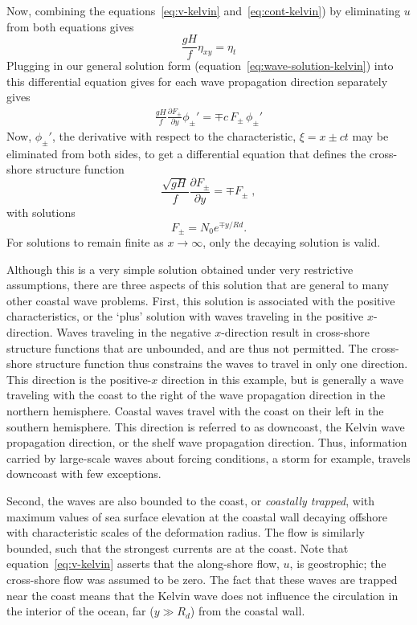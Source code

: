 \documentclass[11pt]{report}
\numberwithin{equation}{section}
\begin{document}
Now, combining the equations~\ref{eq:v-kelvin} and~\ref{eq:cont-kelvin}) by eliminating $u$ from both equations gives
\begin{equation}
    \label{eq:F-solution-kelvin}
    \frac{g H}{f} \eta_{x y} = \eta_t
\end{equation}
Plugging in our general solution form (equation~\ref{eq:wave-solution-kelvin})  into this differential equation gives for each wave propagation direction separately gives
\begin{align}
    \frac{g H}{f} \frac{\partial F_\pm}{\partial y} \phi_\pm' = \mp c \,F_\pm\,\phi_\pm'
\end{align}
Now, $\phi_\pm'$, the derivative with respect to the characteristic, $\xi=x \pm c t$ may be eliminated from both sides, to get a differential equation that defines the cross-shore structure function
\begin{equation}
    \label{eq:F-eqn-kelvin}
    \frac{\sqrt{gH}}{f} \frac{\partial F_\pm}{\partial y} = \mp F_\pm \; ,
\end{equation} 
with solutions
\begin{equation}
    F_\pm = N_0 e^{\mp y / Rd}.
\end{equation}
For solutions to remain finite as $x \rightarrow \infty$, only the decaying solution is valid.  

Although this is a very simple solution obtained under very restrictive assumptions, there are three aspects of this solution that are general to many other coastal wave problems.  First, this solution is associated with the positive characteristics, or the `plus' solution with waves traveling in the positive $x$-direction.  Waves traveling in the negative $x$-direction result in cross-shore structure functions that are unbounded, and are thus not permitted.  The cross-shore structure function thus constrains the waves to travel in only one direction.  This direction is the positive-$x$ direction in this example, but is generally a wave traveling with the coast to the right of the wave propagation direction in the northern hemisphere.  Coastal waves travel with the coast on their left in the southern hemisphere.  This direction is referred to as downcoast, the Kelvin wave propagation direction, or the shelf wave propagation direction.  Thus, information carried by large-scale waves about forcing conditions, a storm for example, travels downcoast with few exceptions.

Second, the waves are also bounded to the coast, or \emph{coastally trapped}, with maximum values of sea surface elevation at the coastal wall decaying offshore with characteristic scales of the deformation radius.  The flow is similarly bounded, such that the strongest currents are at the coast.  Note that equation~\ref{eq:v-kelvin} asserts that the along-shore flow, $u$, is geostrophic; the cross-shore flow was assumed to be zero.  The fact that these waves are trapped near the coast means that the Kelvin wave does not influence the circulation in the interior of the ocean, far ($y \gg R_d$) from the coastal wall.
\end{document}
